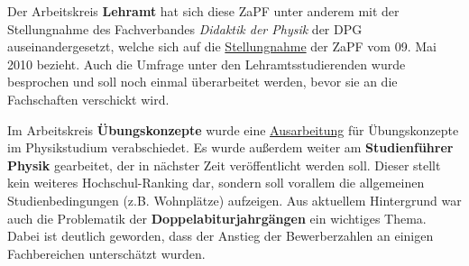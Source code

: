 \documentclass{scrartcl}
\begin{document}
Der Arbeitskreis \textbf{Lehramt} hat sich diese ZaPF unter anderem mit der Stellungnahme des Fachverbandes
\textit{Didaktik der Physik} der DPG auseinandergesetzt, welche sich auf die
\href{http://www.zapfev.de/resolutionen/sose10/Lehramtstellungnahme.pdf}{Stellungnahme} der ZaPF vom 09. Mai 2010 bezieht.
Auch die Umfrage unter den Lehramtsstudierenden wurde besprochen und soll noch einmal überarbeitet werden,
bevor sie an die Fachschaften verschickt wird.

Im Arbeitskreis \textbf{Übungskonzepte} wurde eine
\href{http://www.zapfev.de/resolutionen/sose11/Reso_Uebungskonzepte.pdf}{Ausarbeitung} für
Übungskonzepte im Physikstudium verabschiedet. Es wurde außerdem weiter am \textbf{Studienführer Physik} gearbeitet,
der in nächster Zeit veröffentlicht werden soll. Dieser stellt kein weiteres Hochschul-Ranking dar, sondern soll
vorallem die allgemeinen Studienbedingungen (z.B. Wohnplätze) aufzeigen. Aus aktuellem Hintergrund war auch die
Problematik der \textbf{Doppelabiturjahrgängen} ein wichtiges Thema. Dabei ist deutlich geworden, dass der Anstieg der
Bewerberzahlen an einigen Fachbereichen unterschätzt wurden.
 
\end{document}
